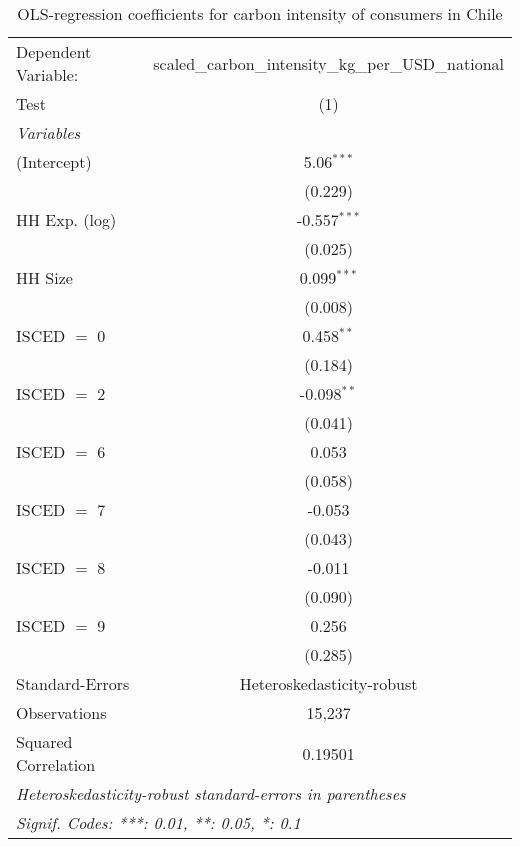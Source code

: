 
\begin{table}[htbp!]
   \centering
   \small
   \begin{adjustbox}{width = 1\textwidth, max height = 0.95\textheight, center}
      \begin{threeparttable}[b]
         \caption{\label{tab:OLS_1_CHL} OLS-regression coefficients for carbon intensity of consumers in Chile}
         \begin{tabular}{lc}
            \tabularnewline \midrule \midrule
            Dependent Variable: & scaled\_carbon\_intensity\_kg\_per\_USD\_national\\        
            Test                & (1)\\  
            \midrule
            \emph{Variables}\\
            (Intercept)         & 5.06$^{***}$\\   
                                & (0.229)\\   
            HH Exp. (log)       & -0.557$^{***}$\\   
                                & (0.025)\\   
            HH Size             & 0.099$^{***}$\\   
                                & (0.008)\\   
            ISCED $=$ 0         & 0.458$^{**}$\\   
                                & (0.184)\\   
            ISCED $=$ 2         & -0.098$^{**}$\\   
                                & (0.041)\\   
            ISCED $=$ 6         & 0.053\\   
                                & (0.058)\\   
            ISCED $=$ 7         & -0.053\\   
                                & (0.043)\\   
            ISCED $=$ 8         & -0.011\\   
                                & (0.090)\\   
            ISCED $=$ 9         & 0.256\\   
                                & (0.285)\\   
            \midrule 
            Standard-Errors     & Heteroskedasticity-robust \\   
            Observations        & 15,237\\  
            Squared Correlation & 0.19501\\  
            \midrule \midrule
            \multicolumn{2}{l}{\emph{Heteroskedasticity-robust standard-errors in parentheses}}\\
            \multicolumn{2}{l}{\emph{Signif. Codes: ***: 0.01, **: 0.05, *: 0.1}}\\
         \end{tabular}
         

\end{threeparttable}
\end{adjustbox}
\end{table}
